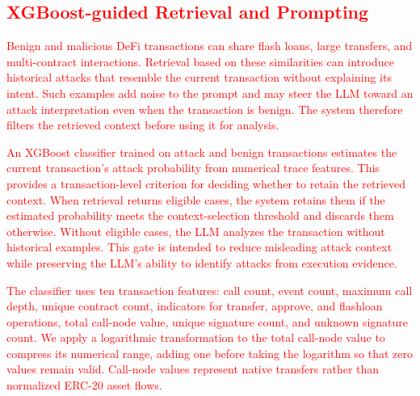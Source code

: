 \subsection{\textcolor{red}{XGBoost-guided Retrieval and Prompting}}
\label{sec:xgb-guidance}

\textcolor{red}{Benign and malicious DeFi transactions can share flash loans, large transfers, and multi-contract interactions. Retrieval based on these similarities can introduce historical attacks that resemble the current transaction without explaining its intent. Such examples add noise to the prompt and may steer the LLM toward an attack interpretation even when the transaction is benign. The system therefore filters the retrieved context before using it for analysis.}

\textcolor{red}{An XGBoost classifier trained on attack and benign transactions estimates the current transaction's attack probability from numerical trace features. This provides a transaction-level criterion for deciding whether to retain the retrieved context. When retrieval returns eligible cases, the system retains them if the estimated probability meets the context-selection threshold and discards them otherwise. Without eligible cases, the LLM analyzes the transaction without historical examples. This gate is intended to reduce misleading attack context while preserving the LLM's ability to identify attacks from execution evidence.}


\textcolor{red}{The classifier uses ten transaction features: call count, event count, maximum call depth, unique contract count, indicators for transfer, approve, and flashloan operations, total call-node value, unique signature count, and unknown signature count. We apply a logarithmic transformation to the total call-node value to compress its numerical range, adding one before taking the logarithm so that zero values remain valid. Call-node values represent native transfers rather than normalized ERC-20 asset flows.}

